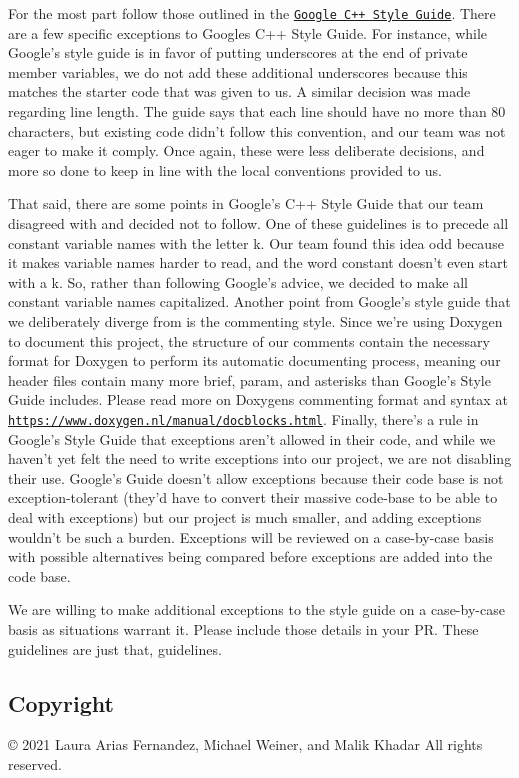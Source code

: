 For the most part follow those outlined in the \href{https://google.github.io/styleguide/cppguide.html}{\tt Google C++ Style Guide}. There are a few specific exceptions to Google\textquotesingle{}s C++ Style Guide. For instance, while Google’s style guide is in favor of putting underscores at the end of private member variables, we do not add these additional underscores because this matches the starter code that was given to us. A similar decision was made regarding line length. The guide says that each line should have no more than 80 characters, but existing code didn’t follow this convention, and our team was not eager to make it comply. Once again, these were less deliberate decisions, and more so done to keep in line with the local conventions provided to us.

That said, there are some points in Google’s C++ Style Guide that our team disagreed with and decided not to follow. One of these guidelines is to precede all constant variable names with the letter k. Our team found this idea odd because it makes variable names harder to read, and the word constant doesn’t even start with a k. So, rather than following Google’s advice, we decided to make all constant variable names capitalized. Another point from Google’s style guide that we deliberately diverge from is the commenting style. Since we’re using Doxygen to document this project, the structure of our comments contain the necessary format for Doxygen to perform its automatic documenting process, meaning our header files contain many more brief, param, and asterisks than Google’s Style Guide includes. Please read more on Doxygen\textquotesingle{}s commenting format and syntax at \href{https://www.doxygen.nl/manual/docblocks.html}{\tt https\+://www.\+doxygen.\+nl/manual/docblocks.\+html}. Finally, there’s a rule in Google’s Style Guide that exceptions aren’t allowed in their code, and while we haven’t yet felt the need to write exceptions into our project, we are not disabling their use. Google’s Guide doesn’t allow exceptions because their code base is not exception-\/tolerant (they’d have to convert their massive code-\/base to be able to deal with exceptions) but our project is much smaller, and adding exceptions wouldn’t be such a burden. Exceptions will be reviewed on a case-\/by-\/case basis with possible alternatives being compared before exceptions are added into the code base.

We are willing to make additional exceptions to the style guide on a case-\/by-\/case basis as situations warrant it. Please include those details in your PR. These guidelines are just that, guidelines.

\subsection*{Copyright}

\copyright{} 2021 Laura Arias Fernandez, Michael Weiner, and Malik Khadar All rights reserved. 